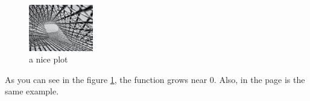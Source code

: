 \documentclass{article}
\begin{document}
    \begin{figure}[h]
        \centering
        \includegraphics[width=0.25\textwidth]{mesh}
        \caption{a nice plot}
        \label{fig:mesh1}
    \end{figure}

    As you can see in the figure \ref{fig:mesh1}, the  function grows near 0. Also, in the page \pageref{fig:mesh1}  is the same example.
\end{document}
